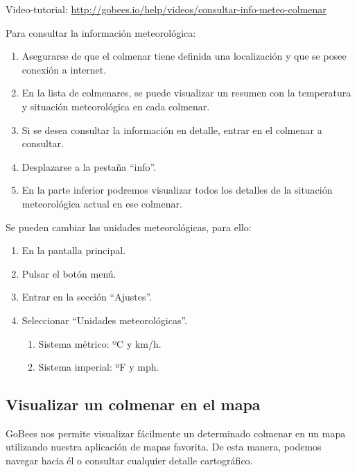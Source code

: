 Video-tutorial:
\url{http://gobees.io/help/videos/consultar-info-meteo-colmenar}

Para consultar la información meteorológica:

\begin{enumerate}
\def\labelenumi{\arabic{enumi}.}
\tightlist
\item
  Asegurarse de que el colmenar tiene definida una localización y que se
  posee conexión a internet.
\item
  En la lista de colmenares, se puede visualizar un resumen con la
  temperatura y situación meteorológica en cada colmenar.
\item
  Si se desea consultar la información en detalle, entrar en el colmenar
  a consultar.
\item
  Desplazarse a la pestaña ``info''.
\item
  En la parte inferior podremos visualizar todos los detalles de la
  situación meteorológica actual en ese colmenar.
\end{enumerate}

Se pueden cambiar las unidades meteorológicas, para ello:

\begin{enumerate}
\def\labelenumi{\arabic{enumi}.}
\tightlist
\item
  En la pantalla principal.
\item
  Pulsar el botón menú.
\item
  Entrar en la sección ``Ajustes''.
\item
  Seleccionar ``Unidades meteorológicas''.

  \begin{enumerate}
  \def\labelenumii{\alph{enumii}.}
  \tightlist
  \item
    Sistema métrico: ºC y km/h.
  \item
    Sistema imperial: ºF y mph.
  \end{enumerate}
\end{enumerate}


\subsection{Visualizar un colmenar en el
mapa}\label{visualizar-un-colmenar-en-el-mapa}

GoBees nos permite visualizar fácilmente un determinado colmenar en un
mapa utilizando nuestra aplicación de mapas favorita. De esta manera,
podemos navegar hacia él o consultar cualquier detalle cartográfico.

